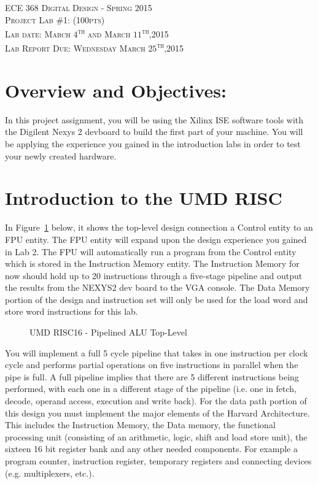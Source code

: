\documentclass{article}
\begin{document}
\begin{center}
\textsc{\huge ECE 368 Digital Design - Spring 2015}\\[1cm]
\textsc{{\LARGE Project Lab \#1: (100pts)}}\\[0.5cm]
\textsc{\Large Lab date: March $4$\textsuperscript{th} and March $11$\textsuperscript{th},2015}\\[0.5cm]
\textsc{\Large Lab Report Due: Wednesday March $25$\textsuperscript{th},2015}\\[1cm]
\end{center}

\section{Overview and Objectives:}
In this project assignment, you will be using the Xilinx ISE software tools with the Digilent Nexys 2 devboard to build the first part of your machine. You will be applying the experience you gained in the introduction labs in order to test your newly created hardware.

\section{Introduction to the UMD RISC}
In Figure~\ref{fig:pipetoplevel} below, it shows the top-level design connection a Control entity to an FPU entity. The FPU entity will expand upon the design experience you gained in Lab 2. The FPU will automatically run a program from the Control entity which is stored in the Instruction Memory entity. The Instruction Memory for now should hold up to 20 instructions through a five-stage pipeline and output the results from the NEXYS2 dev board to the VGA console. The Data Memory portion of the design and instruction set will only be used for the load word and store word instructions for this lab.

\begin{figure}[!htbp]
  \centering
  \caption{UMD RISC16 - Pipelined ALU Top-Level}
  \label{fig:pipetoplevel}
\end{figure}
\FloatBarrier

You will implement a full 5 cycle pipeline that takes in one instruction per clock cycle and performs partial operations on five instructions in parallel when the pipe is full. A full pipeline implies that there are 5 different instructions being performed, with each one in a different stage of the pipeline (i.e. one in fetch, decode, operand access, execution and write back). For the data path portion of this design you must implement the major elements of the Harvard Architecture. This includes the Instruction Memory, the Data memory, the functional processing unit (consisting of an arithmetic, logic, shift and load store unit), the sixteen 16 bit register bank and any other needed components. For example a program counter, instruction register, temporary registers and connecting devices (e.g. multiplexers, etc.). 
\end{document}

